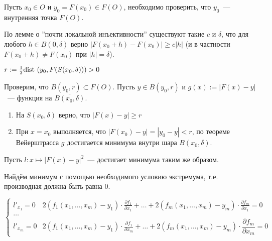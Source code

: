 \documentclass{article}
\begin{document}
            Пусть $x_0 \in O$ и $y_0 = F(x_0) \in F(O)$, необходимо проверить, что $y_0$~--- внутренняя точка $F(O)$.
            
            По лемме о ''почти локальной инъективности'' существуют такие $c$ и $\delta$, что для любого $h \in \overline{B(0, \delta)}$ верно $\left| F(x_0 + h) - F(x_0) \right| \geq c | h |$ (и в частности $F(x_0 + h) \neq F(x_0)$ при $| h | = \delta$).
            
            $r := \frac{1}{2} \dist \left( y_0, F(S(x_0, \delta)) \right) > 0$
            
            Проверим, что $B(y_0, r) \subset F(O)$. Пусть $y \in B(y_0, r)$ и $g(x) := \left| F(x) - y \right|$~--- функция на $\overline{B(x_0, \delta)}$.
            
            \begin{enumerate}
            
                \item На $S(x_0, \delta)$ верно, что $\left| F(x) - y \right| \geq r$
                
                \item При $x = x_0$ выполняется, что $\left| F(x_0) - y \right| = | y_0 - y | < r$, по теореме Вейерштрасса $g$ достигается минимума внутри шара $B(x_0, \delta)$.
                
            \end{enumerate}
            
            Пусть $l : x \mapsto \left| F(x) - y \right|^2$~--- достигает минимума таким же образом.
            
            Найдём минимум с помощью необходимого условию экстремума, т.е. производная должна быть равна $0$.
            
            \begin{equation*}
                \begin{cases}
   
                    l'_{x_1} = 0 & 2 (f_1 (x_1, \ldots, x_m) - y_1) \cdot \frac{\partial f_1}{\partial x_1} + \ldots + 2 (f_m (x_1, \ldots, x_m) - y_m) \cdot \frac{\partial f_m}{\partial x_1} = 0 \\
                    
                    \ldots \\
                    
                    l'_{x_m} = 0 & 2 (f_1 (x_1, \ldots, x_m) - y_1) \cdot \frac{\partial f_1}{\partial x_m} + \ldots + 2 (f_m (x_1, \ldots, x_m) - y_m) \cdot \dfrac{\partial f_m}{\partial x_m} = 0
                
                \end{cases}
            \end{equation*}
            
\end{document}
